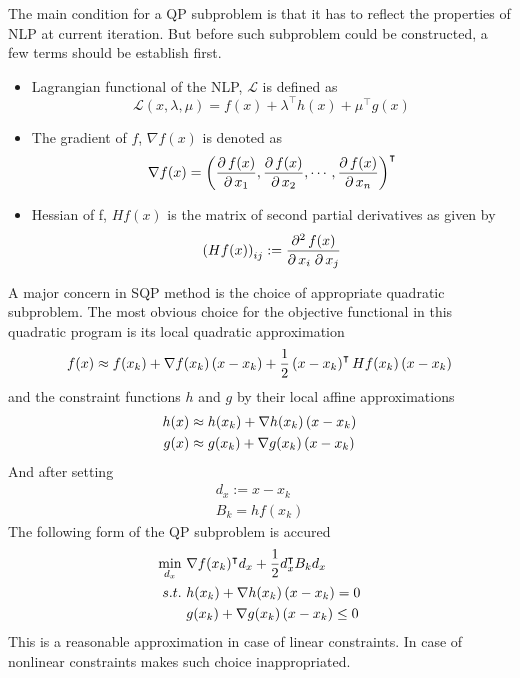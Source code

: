 The main condition for a QP subproblem is that it has to reflect the properties of NLP at current iteration. But before such subproblem could be constructed, a few terms should be establish first.
\begin{itemize}
	\item Lagrangian functional of the NLP, $\mathcal{L}$ is defined as\begin{equation}
		\mathcal{L}(x,\lambda,\mu) = f(x) + \lambda^\intercal h(x) + \mu^\intercal g(x) 
	\end{equation}
	\item The gradient of $f$, $\nabla f(x)$ is denoted as
	\begin{equation}
		\nabla f(x) = \left( \frac{\partial\, f(x)}{\partial\, x_1},\frac{\partial\, f(x)}{\partial\, x_2},\cdots,\frac{\partial\, f(x)}{\partial\, x_n} \right)^\intercal
	\end{equation}
	\item Hessian of f, $Hf(x)$ is the matrix of second partial derivatives as given by
	\begin{equation}
		\left( Hf(x) \right)_{ij} := \frac{\partial^2\, f(x)}{\partial\, x_i\; \partial\, x_j}
	\end{equation}
\end{itemize}
A major concern in SQP method is the choice of appropriate quadratic subproblem. 
The most obvious choice for the objective functional in this quadratic program is its local quadratic approximation
\begin{equation}
f(x)\approx f(x_k)+\nabla f(x_k)\left( x-x_k \right)+\frac{1}{2}\left( x-x_k \right)^\intercal Hf(x_k)\left( x-x_k \right)
\end{equation}
and the constraint functions $h$ and $g$ by their local affine approximations
\begin{subequations}
	\begin{align}
		h(x)&\approx h(x_k)+\nabla h(x_k)\left( x-x_k \right)\\
		g(x)&\approx g(x_k)+\nabla g(x_k)\left( x-x_k \right)	
	\end{align}
\end{subequations}
And after setting 
\begin{subequations}
	\begin{align}
		d_x:=x-x_k\\
		B_k = hf(x_k)
	\end{align}
\end{subequations}
The following form of the QP subproblem is accured
\begin{subequations}
	\begin{align}
		\min_{d_x}\  &\nabla f(x_k)^\intercal d_x+\frac{1}{2}d_x^\intercal B_k d_x\\
		s.t.\  &h(x_k)+\nabla h(x_k)\left( x-x_k \right) = 0\\
		&g(x_k)+\nabla g(x_k)\left( x-x_k \right)\leq 0
	\end{align}
\end{subequations}
This is a reasonable approximation in case of linear constraints. In case of nonlinear constraints makes such choice inappropriated. 

